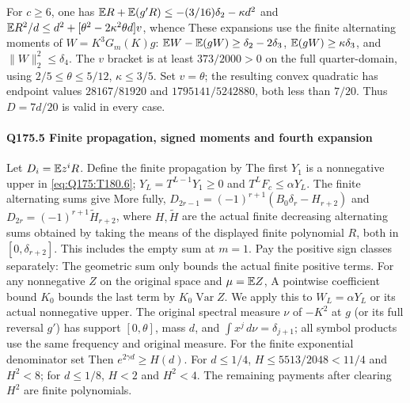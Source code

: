 For $c\ge\allowbreak 6$, one has
$\mathbb E R+\mathbb E(g'R)\le\allowbreak -(3/16)\delta_2-\kappa d^2$ and
$\mathbb E R^2/d\le\allowbreak  d^2+[\theta^2-2\kappa^2\theta d]v$, whence
These expansions use the finite alternating moments of
$W=\allowbreak K^3G_m(K)g$: $\mathbb E W-\mathbb E(gW)\ge\allowbreak \delta_2-2\delta_3$,
$\mathbb E(gW)\ge\allowbreak \kappa\delta_3$, and $\|W\|_2^2\le\allowbreak \delta_4$.
The $v$ bracket is at least $373/2000>\allowbreak 0$ on the full quarter-domain,
using $2/5\le\allowbreak \theta\le\allowbreak 5/12$, $\kappa\le\allowbreak 3/5$.
Set $v=\allowbreak \theta$; the resulting convex quadratic has endpoint values
$28167/81920$ and $1795141/5242880$, both less than $7/20$.
Thus $D=\allowbreak 7d/20$ is valid in every case.

\paragraph{Q175.5 Finite propagation, signed moments and fourth expansion}\label{part:Q175.5}
Let $D_i=\allowbreak \mathbb E z^iR$. Define the finite propagation by
The first $Y_1$ is a nonnegative upper in \eqref{eq:Q175:T180.6};
$Y_L=\allowbreak T^{L-1}Y_1\ge\allowbreak 0$ and $T^LF_c\le\allowbreak \alpha Y_L$.
The finite alternating sums give
More fully,
$D_{2r-1}=\allowbreak (-1)^{r+1}(B_0\delta_r-H_{r+2})$ and
$D_{2r}=\allowbreak (-1)^{r+1}\widetilde H_{r+2}$, where $H,\allowbreak \widetilde H$ are
the actual finite decreasing alternating sums obtained by taking the
means of the displayed finite polynomial $R$, both in $[0,\allowbreak \delta_{r+2}]$.
This includes the empty sum at $m=\allowbreak 1$.
Pay the positive sign classes separately:
The geometric sum only bounds the actual finite positive terms.
For any nonnegative $Z$ on the original space and $\mu=\allowbreak \mathbb E Z$,
A pointwise coefficient bound $K_0$ bounds the last term by
$K_0\operatorname{Var}Z$. We apply this to $W_L=\allowbreak \alpha Y_L$ or its
actual nonnegative upper. The original spectral measure $\nu$ of
$-K^2$ at $g$ (or its full reversal $g'$) has support $[0,\allowbreak \theta]$,
mass $d$, and $\int x^j\,\allowbreak d\nu=\allowbreak \delta_{j+1}$; all symbol products
use the same frequency and original measure.
For the finite exponential denominator set
Then $e^{2\gamma d}\ge\allowbreak  H(d)$.
For $d\le\allowbreak 1/4$, $H\le\allowbreak 5513/2048<\allowbreak 11/4$ and $H^2<\allowbreak 8$;
for $d\le\allowbreak 1/8$, $H<\allowbreak 2$ and $H^2<\allowbreak 4$.
The remaining payments after clearing $H^2$ are finite polynomials.

